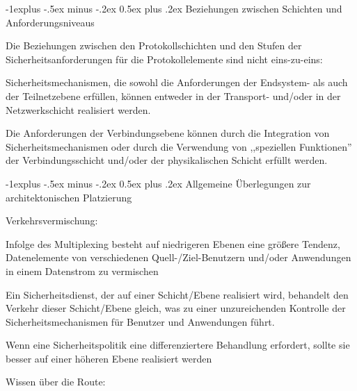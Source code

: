 \documentclass[a4paper]{article}
\makeatletter
\renewcommand{\subsection}{\@startsection{subsection}{2}{0mm}%
 {-1explus -.5ex minus -.2ex}%
 {0.5ex plus .2ex}%
 {\normalfont\normalsize\bfseries}}
\makeatother
\begin{document}
\begin{multicols}{3}
      \subsection{Beziehungen zwischen Schichten und
            Anforderungsniveaus}

      \begin{itemize*}
            \item
            Die Beziehungen zwischen den Protokollschichten und den Stufen der
            Sicherheitsanforderungen für die Protokollelemente sind nicht
            eins-zu-eins:

            \begin{itemize*}
                  \item Sicherheitsmechanismen, die sowohl die Anforderungen der Endsystem- als auch der Teilnetzebene erfüllen, können entweder in der Transport- und/oder in der Netzwerkschicht realisiert werden.
                  \item Die Anforderungen der Verbindungsebene können durch die Integration von Sicherheitsmechanismen oder durch die Verwendung von ,,speziellen Funktionen'' der Verbindungsschicht und/oder der physikalischen Schicht erfüllt werden.
            \end{itemize*}
      \end{itemize*}


      \subsection{Allgemeine Überlegungen zur architektonischen
            Platzierung}

      \begin{itemize*}
            \item
            Verkehrsvermischung:

            \begin{itemize*}
                  \item Infolge des Multiplexing besteht auf niedrigeren Ebenen eine größere Tendenz, Datenelemente von verschiedenen Quell-/Ziel-Benutzern und/oder Anwendungen in einem Datenstrom zu vermischen
                  \item Ein Sicherheitsdienst, der auf einer Schicht/Ebene realisiert wird, behandelt den Verkehr dieser Schicht/Ebene gleich, was zu einer unzureichenden Kontrolle der Sicherheitsmechanismen für Benutzer und Anwendungen führt.
                  \item Wenn eine Sicherheitspolitik eine differenziertere Behandlung erfordert, sollte sie besser auf einer höheren Ebene realisiert werden
            \end{itemize*}
            \item
            Wissen über die Route:


\end{itemize*}
\end{multicols}
\end{document}
